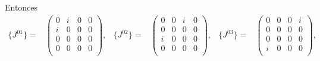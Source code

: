 \begin{frame}
Entonces
\begin{align}
  \label{eq:xii}
 \{ J^{01}\}=& \begin{pmatrix}
     0 & i & 0 & 0\\
     i & 0 & 0 & 0\\
     0 & 0 & 0 & 0\\      
     0 & 0 & 0 & 0\\      
   \end{pmatrix},&
 \{ J^{02}\}=& \begin{pmatrix}
     0 & 0 & i & 0\\
     0 & 0 & 0 & 0\\
     i & 0 & 0 & 0\\      
     0 & 0 & 0 & 0\\      
   \end{pmatrix},&
 \{ J^{03}\}=& \begin{pmatrix}
     0 & 0 & 0 & i\\
     0 & 0 & 0 & 0\\
     0 & 0 & 0 & 0\\      
     i & 0 & 0 & 0\\      
   \end{pmatrix}, %
\end{align}

\end{frame}
